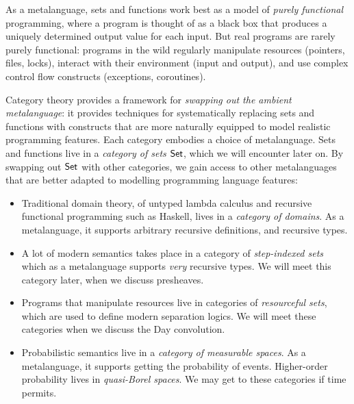 As a metalanguage, sets and functions work best as a model of \emph{purely functional} programming,
where a program is thought of as a black box that produces a uniquely determined output value
for each input.
But real programs are rarely purely functional:
programs in the wild regularly manipulate resources (pointers, files, locks),
interact with their environment (input and output),
and use complex control flow constructs (exceptions, coroutines).

Category theory provides a framework for \emph{swapping out the ambient metalanguage}:
it provides techniques for systematically
replacing sets and functions with constructs that are more naturally equipped to model
realistic programming features.
Each category embodies a choice of metalanguage.
Sets and functions live in a \emph{category of sets} \(\mathsf{Set}\),
which we will encounter later on.
By swapping out \(\mathsf{Set}\) with other categories,
we gain access to other metalanguages that are better adapted to modelling programming language features:
\begin{itemize}
\item Traditional domain theory, of untyped lambda calculus and recursive
  functional programming such as Haskell, lives in a \emph{category of domains}.
  As a metalanguage, it supports arbitrary recursive definitions,
  and recursive types.
\item
  A lot of modern semantics takes place in
  a category of \emph{step-indexed sets}
  which as a metalanguage supports \emph{very} recursive types.
  We will meet this category later, when we discuss presheaves.
\item Programs that manipulate resources
  live in categories of \emph{resourceful sets},
  which are used to define modern separation logics.
  We will meet these categories when we discuss the Day convolution.
\item Probabilistic semantics live in a \emph{category of measurable spaces}.
  As a metalanguage, it supports getting the probability of events.
  Higher-order probability lives in \emph{quasi-Borel spaces}.
  We may get to these categories if time permits.
\end{itemize}

